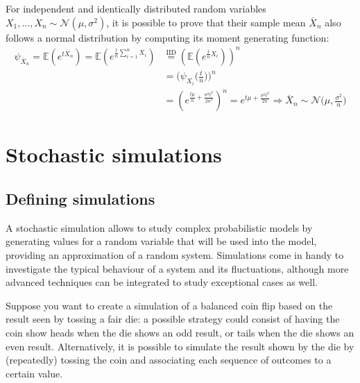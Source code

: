 \documentclass{report}
\begin{document}
\begin{examplebox}
    For independent and identically distributed random variables $\displaystyle X_1, \dots, X_n \sim \mathcal{N}(\mu, \sigma^2)$, it is possible to prove that their sample mean $\displaystyle \overline{X}_n$ also follows a normal distribution by computing its moment generating function:
    \begin{align*}
        \psi_{\overline{X}_n} = \mathbb{E}(e^{t\overline{X}_n}) = \mathbb{E}(e^{\frac{t}{n}\sum_{i = 1}^n X_i})
            &\stackrel{\text{IID}}{=} (\mathbb{E}(e^{\frac{t}{n}X_i}))^n \\
            &= \Bigg(\psi_{X_i}\Bigg(\frac{t}{n}\Bigg)\Bigg)^n \\
            &= (e^{\frac{t\mu}{n} + \frac{\sigma^2t^2}{2n^2}})^n = e^{t\mu + \frac{\sigma^2t^2}{2n}} \Rightarrow \overline{X}_n \sim \mathcal{N}\Big(\mu, \frac{\sigma^2}{n}\Big)
    \end{align*}
\end{examplebox}

\chapter{Stochastic simulations}
\section{Defining simulations}
A stochastic simulation allows to study complex probabilistic models by generating values for a random variable that will be used into the model, providing an approximation of a random system. \newline
Simulations come in handy to investigate the typical behaviour of a system and its fluctuations, although more advanced techniques can be integrated to study exceptional cases as well.
\begin{examplebox}
    Suppose you want to create a simulation of a balanced coin flip based on the result seen by tossing a fair die: a possible strategy could consist of having the coin show heads when the die shows an odd result, or tails when the die shows an even result. \newline
    Alternatively, it is possible to simulate the result shown by the die by (repeatedly) tossing the coin and associating each sequence of outcomes to a certain value.
\end{examplebox}
\end{document}
